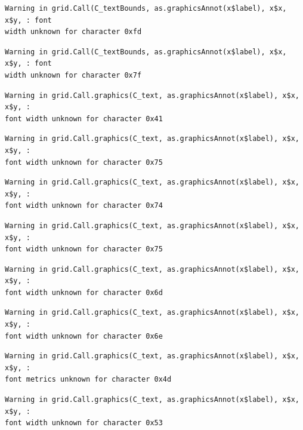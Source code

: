 \documentclass[
  letterpaper,
  DIV=11,
  numbers=noendperiod]{scrreprt}
\begin{document}
\begin{verbatim}
Warning in grid.Call(C_textBounds, as.graphicsAnnot(x$label), x$x, x$y, : font
width unknown for character 0xfd
\end{verbatim}

\begin{verbatim}
Warning in grid.Call(C_textBounds, as.graphicsAnnot(x$label), x$x, x$y, : font
width unknown for character 0x7f
\end{verbatim}

\begin{verbatim}
Warning in grid.Call.graphics(C_text, as.graphicsAnnot(x$label), x$x, x$y, :
font width unknown for character 0x41
\end{verbatim}

\begin{verbatim}
Warning in grid.Call.graphics(C_text, as.graphicsAnnot(x$label), x$x, x$y, :
font width unknown for character 0x75
\end{verbatim}

\begin{verbatim}
Warning in grid.Call.graphics(C_text, as.graphicsAnnot(x$label), x$x, x$y, :
font width unknown for character 0x74
\end{verbatim}

\begin{verbatim}
Warning in grid.Call.graphics(C_text, as.graphicsAnnot(x$label), x$x, x$y, :
font width unknown for character 0x75
\end{verbatim}

\begin{verbatim}
Warning in grid.Call.graphics(C_text, as.graphicsAnnot(x$label), x$x, x$y, :
font width unknown for character 0x6d
\end{verbatim}

\begin{verbatim}
Warning in grid.Call.graphics(C_text, as.graphicsAnnot(x$label), x$x, x$y, :
font width unknown for character 0x6e
\end{verbatim}

\begin{verbatim}
Warning in grid.Call.graphics(C_text, as.graphicsAnnot(x$label), x$x, x$y, :
font metrics unknown for character 0x4d
\end{verbatim}

\begin{verbatim}
Warning in grid.Call.graphics(C_text, as.graphicsAnnot(x$label), x$x, x$y, :
font width unknown for character 0x53
\end{verbatim}
\end{document}
